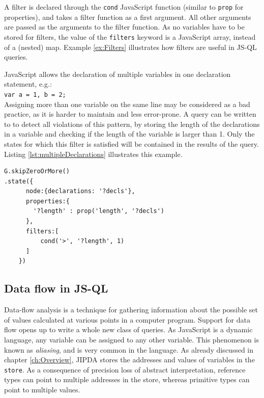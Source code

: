 A filter is declared through the \texttt{cond} JavaScript function (similar to \texttt{prop} for properties), and takes a filter function as a first argument. All other arguments are passed as the arguments to the filter function. As no variables have to be stored for filters, the value of the \texttt{filters} keyword is a JavaScript array, instead of a (nested) map. 
Example \ref{ex:Filters} illustrates how filters are useful in JS-QL queries.

\begin{exmp}
\label{ex:Filters}
JavaScript allows the declaration of multiple variables in one declaration statement, e.g.:\\\texttt{var a = 1, b = 2;} \\Assigning more than one variable on the same line may be considered as a bad practice, as it is harder to maintain and less error-prone. A query can be written to to detect all violations of this pattern, by storing the length of the declarations in a variable and checking if the length of the variable is larger than 1. Only the states for which this filter is satisfied will be contained in the results of the query. Listing \ref{lst:multipleDeclarations} illustrates this example.

\begin{lstlisting}[label={lst:multipleDeclarations},language=JSQL, caption=Filtering for multiple declarations,mathescape=true]
G.skipZeroOrMore()
.state({
      node:{declarations: '?decls'},
      properties:{
        '?length' : prop('length', '?decls')
      },
      filters:[
          cond('>', '?length', 1)
      ]
    }) 
\end{lstlisting}
\end{exmp}

\subsection{Data flow in JS-QL}
Data-flow analysis is a technique for gathering information about the possible set of values calculated at various points in a computer program. Support for data flow opens up to write a whole new class of queries. As JavaScript is a dynamic language, any variable can be assigned to any other variable. This phenomenon is known as \textit{aliasing}, and is very common in the language. As already discussed in chapter \ref{ch:Overview}, JIPDA stores the addresses and values of variables in the \texttt{store}. %
As a consequence of precision loss of abstract interpretation, reference types can point to multiple addresses in the store, whereas primitive types can point to multiple values.

